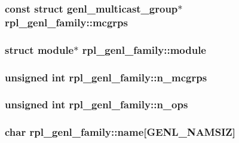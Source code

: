 \subsubsection[{mcgrps}]{\setlength{\rightskip}{0pt plus 5cm}const struct genl\+\_\+multicast\+\_\+group$\ast$ rpl\+\_\+genl\+\_\+family\+::mcgrps}\label{structrpl__genl__family_aa824bef8504ad3a92bc3fdd62d7554ec}
\hypertarget{structrpl__genl__family_a8c514aedced0b4c6421aa08881aa1609}{}
\subsubsection[{module}]{\setlength{\rightskip}{0pt plus 5cm}struct module$\ast$ rpl\+\_\+genl\+\_\+family\+::module}\label{structrpl__genl__family_a8c514aedced0b4c6421aa08881aa1609}
\hypertarget{structrpl__genl__family_aa39896dd5abd2de8beaeaa1a39d61c98}{}
\subsubsection[{n\+\_\+mcgrps}]{\setlength{\rightskip}{0pt plus 5cm}unsigned int rpl\+\_\+genl\+\_\+family\+::n\+\_\+mcgrps}\label{structrpl__genl__family_aa39896dd5abd2de8beaeaa1a39d61c98}
\hypertarget{structrpl__genl__family_a2015e11f05185d06f8ef4125a43fd48b}{}
\subsubsection[{n\+\_\+ops}]{\setlength{\rightskip}{0pt plus 5cm}unsigned int rpl\+\_\+genl\+\_\+family\+::n\+\_\+ops}\label{structrpl__genl__family_a2015e11f05185d06f8ef4125a43fd48b}
\hypertarget{structrpl__genl__family_a0ee3a650097beb5d2e4a4deb301cb479}{}
\subsubsection[{name}]{\setlength{\rightskip}{0pt plus 5cm}char rpl\+\_\+genl\+\_\+family\+::name\mbox{[}G\+E\+N\+L\+\_\+\+N\+A\+M\+S\+I\+Z\mbox{]}}\label{structrpl__genl__family_a0ee3a650097beb5d2e4a4deb301cb479}
\hypertarget{structrpl__genl__family_a126424f7f454c57970d3aa43fa6f6321}{}
